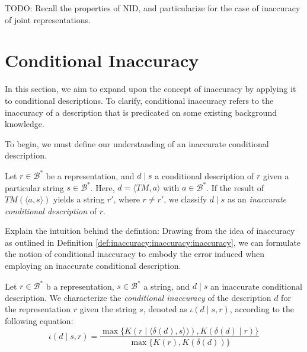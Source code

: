 {\color{red} TODO: Recall the properties of NID, and particularize for the case of inaccuracy of joint representations.}

%
%

\section{Conditional Inaccuracy}

In this section, we aim to expand upon the concept of inaccuracy by applying it to conditional descriptions. To clarify, conditional inaccuracy refers to the inaccuracy of a description that is predicated on some existing background knowledge.

To begin, we must define our understanding of an inaccurate conditional description.

\begin{definition}
Let $r \in \mathcal{B}^\ast$ be a representation, and $d \mid s$ a conditional description of $r$ given a particular string $s \in \mathcal{B}^\ast$. Here, $d = \langle TM, a \rangle$ with $a \in \mathcal{B}^\ast$. If the result of $TM \left(\langle a, s \rangle \right)$ yields a string $r'$, where $r \neq r'$, we classify $d \mid s$ as an \emph{inaccurate conditional description} of $r$.
\end{definition}

{\color{red} Explain the intuition behind the defintion: Drawing from the idea of inaccuracy as outlined in Definition \ref{def:inaccuracy:inaccuracy:inaccuracy}, we can formulate the notion of conditional inaccuracy to embody the error induced when employing an inaccurate conditional description.}

\begin{definition}
Let $r \in \mathcal{B}^\ast$ b a representation, $s \in \mathcal{B}^\ast$ a string, and $d \mid s$ an inaccurate conditional description. We characterize the \emph{conditional inaccuracy} of the description $d$ for the representation $r$ given the string $s$, denoted as $\iota(d \mid s, r)$, according to the following equation:
\[
\iota(d \mid s, r) = \frac{ \max\{ K \left(r \mid \langle \delta(d), s \rangle) \right), K \left( \delta(d) \mid r \right) \} } { \max\{ K(r), K \left( \delta (d) \right) \} }
\]
\end{definition}


